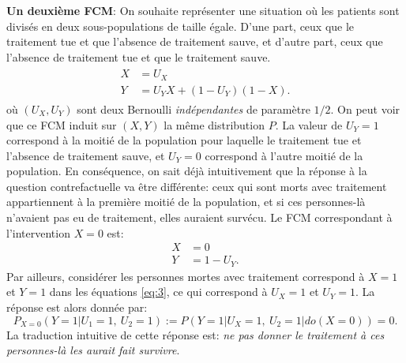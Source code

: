 \textbf{Un deuxième FCM}:
On souhaite représenter une situation où les patients sont divisés en deux sous-populations de taille égale. D'une part, ceux que le traitement tue et que l'absence de traitement sauve, et d'autre part, ceux que l'absence de traitement tue et que le traitement sauve.
\begin{align}
  \label{eq:3}
  \begin{split}
  X&=U_X\\
  Y&=U_YX+(1-U_Y)(1-X).
  \end{split}
\end{align}
où $(U_X,U_Y)$ sont deux Bernoulli \emph{indépendantes} de paramètre
$1/2$. On peut voir que ce FCM induit sur $(X,Y)$ la même distribution
$P$. La valeur de $U_Y=1$ correspond à la moitié de la population pour
laquelle le traitement tue et l'absence de traitement sauve, et
$U_Y=0$ correspond à l'autre moitié de la population.  En conséquence,
on sait déjà intuitivement que la réponse à la question
contrefactuelle va être différente:
ceux qui sont morts avec traitement appartiennent à la première moitié de la population, et si ces personnes-là n'avaient pas eu de traitement, elles auraient survécu.
Le FCM correspondant à l'intervention $X=0$ est:
\begin{align*}
  X&=0\\
  Y&=1-U_Y.
\end{align*}
Par ailleurs, considérer les personnes mortes avec traitement
correspond à $X=1$ et $Y=1$ dans les équations \eqref{eq:3}, ce qui
correspond à $U_X=1$ et $U_Y=1$. La réponse est alors donnée par:
\[ P_{X=0}(Y=1|U_1=1,\ U_2=1):=P(Y=1|U_X=1,\ U_2=1|do(X=0))=0. \]
La traduction intuitive de cette réponse est: \emph{ne pas donner le
  traitement à ces personnes-là les aurait fait survivre}.
